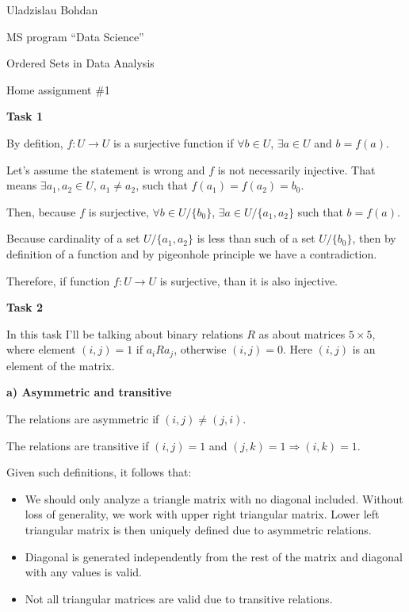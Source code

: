 \documentclass{article}
\begin{document}
{\Large

Uladzislau Bohdan

MS program ``Data Science''

Ordered Sets in Data Analysis

\vspace{5mm}

Home assignment \#1

}

\vspace{8mm}

\textbf{Task 1}

By defition, $f: U \rightarrow U$ is a surjective function if
$\forall b \in U$, $\exists a \in U$ and $b = f(a)$.

Let's assume the statement is wrong and $f$ is not necessarily injective. That means
$\exists a_1, a_2 \in U$, $a_1 \neq a_2$, such that $f(a_1) = f(a_2) = b_0$.

Then, because $f$ is surjective, $\forall b \in U/\{b_0\}$, $\exists a \in U/\{a_1, a_2\}$ such that $b = f(a)$.

Because cardinality of a set $U/\{a_1, a_2\}$ is less than such of a set $U/\{b_0\}$,
then by definition of a function and by pigeonhole principle we have a contradiction.

Therefore, if function $f: U \rightarrow U$ is surjective, than it is also injective.

\vspace{8mm}

\textbf{Task 2}

In this task I'll be talking about binary relations $R$ as about matrices $5 \times 5$,
where element $(i, j) = 1$ if $a_i R a_j$, otherwise $(i, j) = 0$. Here $(i, j)$ is an element of the matrix.

\textbf{a) Asymmetric and transitive}

The relations are asymmetric if $(i, j) \neq (j, i)$.

The relations are transitive if $(i, j) = 1$ and $(j, k) = 1 \Rightarrow (i, k) = 1$.

Given such definitions, it follows that:
\begin{itemize}
  \item We should only analyze a triangle matrix with no diagonal included.
  Without loss of generality, we work with upper right triangular matrix.
  Lower left triangular matrix is then uniquely defined due to asymmetric relations.
  \item Diagonal is generated independently from the rest of the matrix and diagonal with any values is valid.
  \item Not all triangular matrices are valid due to transitive relations.
\end{itemize}
\end{document}
